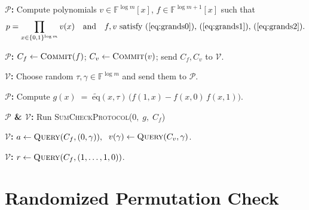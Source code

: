 \documentclass{zkdl-presentation-template}
\begin{document}
    \begin{frame}
        \begin{algorithm}[H]
            \caption{Grand Product Check}\label{alg:sum_check_grand_product}
            \DontPrintSemicolon
            \SetAlgoLined

            \textbf{$\mathcal P$:}
            Compute polynomials 
            $v\in\mathbb{F}^{\log m}[x]$, 
            $f\in\mathbb{F}^{\log m+1}[x]$ 
            such that
            \vspace{-1em}
            \begin{equation*}
                \vspace{-1.6em}
                p = \prod_{x\in\{0,1\}^{\log m}} v(x)
                \quad\text{and}\quad
                f, v \text{ satisfy }(\ref{eq:grands0}),\,(\ref{eq:grands1}),\,(\ref{eq:grands2}).
                \vspace{-5px}
            \end{equation*}\;

            \textbf{$\mathcal P$:}
            $C_f \leftarrow \textsc{Commit}(f)$;
            $C_v \leftarrow \textsc{Commit}(v)$;
            send $C_f, C_v$ to $\mathcal V$.\;

            \textbf{$\mathcal V$:}
            Choose random $\tau,\gamma\in\mathbb{F}^{\log m}$ and send them to $\mathcal P$.\;

            \textbf{$\mathcal P$:}
            Compute $g(x)\;=\;\widetilde{\mathrm{eq}}(x,\tau)\,\bigl(f(1,x)-f(x,0)\,f(x,1)\bigr).$

            \textbf{$\mathcal P$ \& $\mathcal V$:}
            Run \textsc{SumCheckProtocol}($0,\;g,\;C_f$)

            \textbf{$\mathcal V$:}
            $a \leftarrow \textsc{Query}(C_f,(0,\gamma)), \;$ $v(\gamma)\leftarrow \textsc{Query}(C_v,\gamma)$.\;

            \textbf{$\mathcal V$:}
            $r \leftarrow \textsc{Query}(C_f,(1,\dots,1,0))$.\;
        \end{algorithm}
    \end{frame}

    \section{Randomized Permutation Check}
\end{document}

